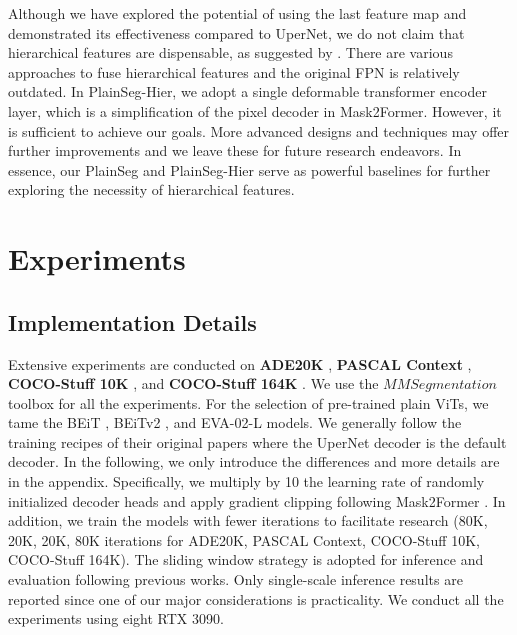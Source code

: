 \documentclass{article} \usepackage{iclr2024_conference,times}
\begin{document}
Although we have explored the potential of using the last feature map and demonstrated its effectiveness compared to UperNet, we do not claim that hierarchical features are dispensable, as suggested by \cite{li2022exploring}. There are various approaches to fuse hierarchical features and the original FPN \citep{lin2017feature} is relatively outdated. In PlainSeg-Hier, we adopt a single deformable transformer encoder layer, which is a simplification of the pixel decoder in Mask2Former. However, it is sufficient to achieve our goals. More advanced designs and techniques may offer further improvements and we leave these for future research endeavors. In essence, our PlainSeg and PlainSeg-Hier serve as powerful baselines for further exploring the necessity of hierarchical features.







\section{Experiments}


\subsection{Implementation Details}

Extensive experiments are conducted on \textbf{ADE20K} \citep{zhou2017scene}, \textbf{PASCAL Context} \citep{mottaghi2014role}, \textbf{COCO-Stuff 10K} \citep{caesar2018coco}, and \textbf{COCO-Stuff 164K} \citep{caesar2018coco}. We use the $\mathit{MMSegmentation}$ \citep{contributors2020mmsegmentation} toolbox for all the experiments. For the selection of pre-trained plain ViTs, we tame the BEiT \citep{bao2022beit}, BEiTv2 \citep{peng2022beit}, and EVA-02-L \citep{fang2023eva} models. We generally follow the training recipes of their original papers where the UperNet decoder is the default decoder. In the following, we only introduce the differences and more details are in the appendix. Specifically, we multiply by 10 the learning rate of randomly initialized decoder heads and apply gradient clipping following Mask2Former \citep{cheng2022masked}. In addition, we train the models with fewer iterations to facilitate research (80K, 20K, 20K, 80K iterations for ADE20K, PASCAL Context, COCO-Stuff 10K, COCO-Stuff 164K). The sliding window strategy is adopted for inference and evaluation following previous works. Only single-scale inference results are reported since one of our major considerations is practicality. We conduct all the experiments using eight RTX 3090.
\end{document}
